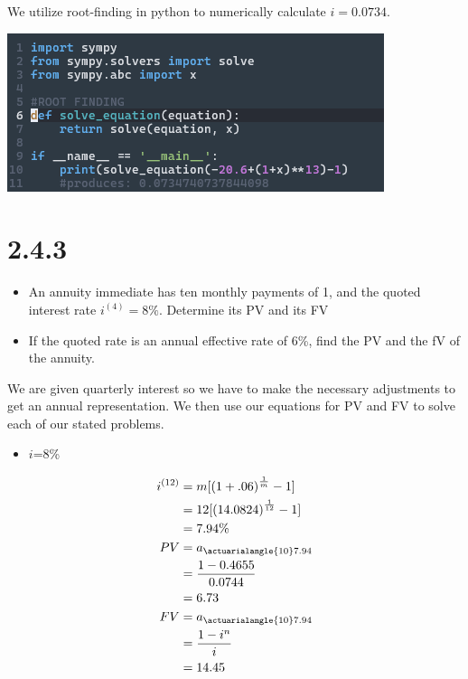 \documentclass[12pt]{article}
\begin{document}
We utilize root-finding in python to numerically calculate $i=0.0734$.

\includegraphics{./images/esungehw5q1.png}

\section{2.4.3}                                                                                                      
\begin{itemize}                                                                                                                              
	\item An annuity immediate has ten monthly payments of 1, and the quoted interest rate $i^{(4)}=8\%$. Determine its PV and its FV\\
        \item If the quoted rate is an annual effective rate of 6\%, find the PV and the fV of the annuity.                          
\end{itemize}
We are given quarterly interest so we have to make the necessary adjustments to get an annual representation. We then
use our equations for PV and FV to solve each of our stated problems.
\begin{itemize}
	\item $i$=8\%\\
\end{itemize}
$$
\begin{aligned}
	i^{(12)} &= m[\left(1+.06 \right)^{\frac{1}{m}} -1]\\
		 &= 12[\left(14.0824 \right)^{\frac{1}{12}} -1 ]\\
		 &= 7.94\%\\
	PV &= a_{\actuarialangle{10}7.94}\\
	   &= \frac{1-0.4655}{0.0744}\\
	   &= 6.73\\
	FV &= a_{\actuarialangle{10}7.94}\\
	   &= \frac{1-i^n}{i}\\
	   &= 14.45\\
\end{aligned}
$$
\end{document}

